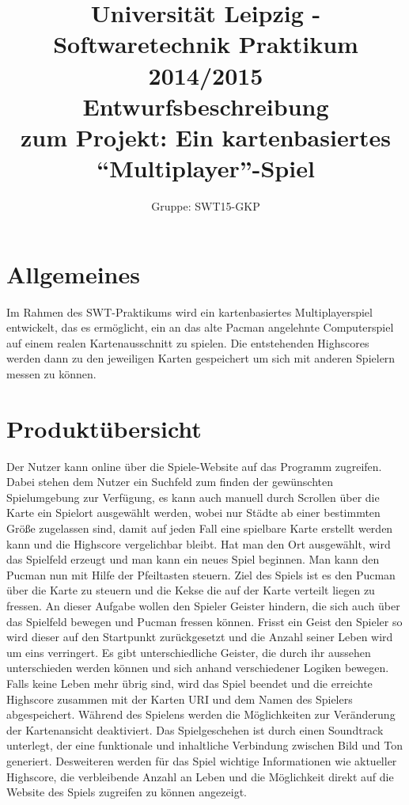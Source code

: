 \documentclass[11pt,a4paper]{article}
\author{Gruppe: SWT15-GKP}
\title{Universität Leipzig - Softwaretechnik Praktikum 2014/2015 \\  Entwurfsbeschreibung \\ zum Projekt: Ein kartenbasiertes “Multiplayer”-Spiel}
\begin{document}
\maketitle


\tableofcontents

\clearpage

\section{Allgemeines}
Im Rahmen des SWT-Praktikums wird ein kartenbasiertes Multiplayerspiel entwickelt, das es ermöglicht, ein an das alte Pacman angelehnte Computerspiel auf einem realen Kartenausschnitt zu spielen. Die entstehenden Highscores werden dann zu den jeweiligen Karten gespeichert um sich mit anderen Spielern messen zu können.


\section{Produktübersicht}
Der Nutzer kann online über die Spiele-Website auf das Programm zugreifen.
Dabei stehen dem Nutzer ein Suchfeld zum finden der gewünschten Spielumgebung zur Verfügung, es kann auch manuell durch Scrollen über die Karte ein Spielort ausgewählt werden, wobei nur Städte ab einer bestimmten Größe zugelassen sind, damit auf jeden Fall eine spielbare Karte erstellt werden kann und die Highscore vergelichbar bleibt. 
Hat man den Ort ausgewählt, wird das Spielfeld erzeugt und man kann ein neues Spiel beginnen. 
Man kann den Pucman nun mit Hilfe der Pfeiltasten steuern.
Ziel des Spiels ist es den Pucman über die Karte zu steuern und die Kekse die auf der Karte verteilt liegen zu fressen. An dieser Aufgabe wollen den Spieler Geister hindern, die sich auch über das Spielfeld bewegen und Pucman fressen können. Frisst ein Geist den Spieler so wird dieser auf den Startpunkt zurückgesetzt und die Anzahl seiner Leben wird um eins verringert.
Es gibt unterschiedliche Geister, die durch ihr aussehen unterschieden werden können und sich anhand verschiedener Logiken bewegen. 
Falls keine Leben mehr übrig sind, wird das Spiel beendet und die erreichte Highscore zusammen mit der Karten URI und dem Namen des Spielers abgespeichert.
Während des Spielens werden die Möglichkeiten zur Veränderung der Kartenansicht deaktiviert. 
Das Spielgeschehen ist durch einen Soundtrack unterlegt, der eine funktionale und inhaltliche Verbindung zwischen Bild und Ton generiert.
Desweiteren werden für das Spiel wichtige Informationen wie aktueller Highscore, die verbleibende Anzahl an Leben und die Möglichkeit direkt auf die Website des Spiels zugreifen zu können angezeigt.
\clearpage
\end{document}
